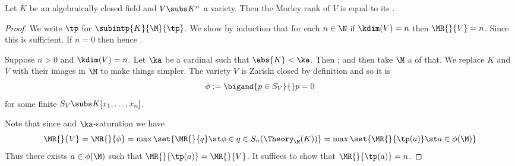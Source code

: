 \begin{prop}
    Let $K$ be an algebraically closed field and $V \subs K^n$ a variety.
    Then the Morley rank of $V$ is equal to its 
    .
\end{prop}
\begin{proof}
    We write $\tp$ for $\subintp{K}{\M}{\tp}$.
    We show by induction that for each $n \in \N$
    if $\kdim(V) = n$
    then $\MR{}{V} = n$.
    Since  this is sufficient.
    If $n = 0$ then  
    hence .

    Suppose $n > 0$ and $\kdim(V) = n$.
    Let $\ka$ be a cardinal such that $\abs{K} < \ka$.
    Then ;
    and then take $\M$ a 
     of 
    that.
    We replace $K$ and $V$ with their images in $\M$ to make things simpler.
    The variety $V$ is Zariski closed by definition and so it is 
    \[\phi := \bigand{p \in S_V}{} p = 0\]
    for some finite $S_V \subs K[x_1,\dots,x_n]$.
    
    Note that since 
    and $\ka$-saturation we have
    \[
        \MR{}{V} = \MR{}{\phi} = 
        \max \set{\MR{}{q} \st \phi \in q \in S_n(\Theory_\M(K))}
        = \max \set{\MR{}{\tp(a)} \st a \in \phi(\M)}
    \]
    Thus there exists $a \in \phi(\M)$ such that $\MR{}{\tp(a)} = \MR{}{V}$.
    It suffices to show that $\MR{}{\tp(a)} = n$.


\end{proof}
